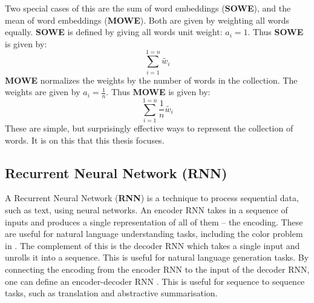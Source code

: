 \documentclass{book}
\begin{document}
Two special cases of this are the sum of word embeddings (\textbf{SOWE}), and the mean of word embeddings (\textbf{MOWE}).
Both are given by weighting all words equally.
\textbf{SOWE} is defined by giving all words unit weight: $a_i = 1$.
Thus \textbf{SOWE} is given by:
\begin{equation}
\sum_{i=1}^{1=n} \tilde{w_i}
\end{equation}
\textbf{MOWE} normalizes the weights by the number of words in the collection.
The weights are given by $a_i = \frac{1}{n}$.
Thus \textbf{MOWE} is given by:
\begin{equation}
\sum_{i=1}^{1=n}  \frac{1}{n} \tilde{w_i}
\end{equation}
These  are simple, but surprisingly effective ways to represent the collection of words.
It is on this that this thesis focuses.

\subsection {Recurrent Neural Network (RNN)}
A Recurrent Neural Network (\textbf{RNN}) is a technique 
to process sequential data, such as text, using neural networks.
An encoder RNN takes in a sequence of inputs and produces a single representation of all of them
-- the encoding.
These are useful for natural language understanding tasks, including the color problem in .
The complement of this is the decoder RNN which takes a single input and unrolls it into a sequence.
This is useful for natural language generation tasks.
By connecting the encoding from the encoder RNN to the input of the decoder RNN,
one can define an encoder-decoder RNN \citep{cho2014properties}.
This is  useful for sequence to sequence tasks, such as translation and abstractive summarisation.
\end{document}
